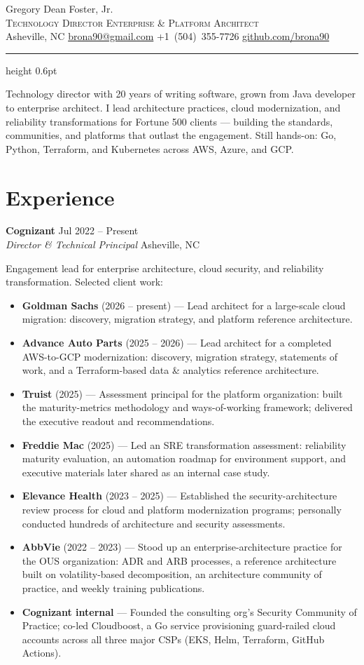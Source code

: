 \documentclass[letterpaper,10pt]{article}
\newcommand{\role}[4]{%
  \par\vspace{8pt}%
  \textbf{\large #1} \hfill {\small\color{muted}#4}\\
  \textit{#3} \hfill {\small\color{muted}#2}\par\vspace{1pt}}
\newenvironment{clients}
  {\begin{itemize}[leftmargin=13pt, itemsep=3pt, topsep=3pt,
                   label=\textcolor{gold}{\textbullet}]}
  {\end{itemize}}
\newcommand{\client}[2]{\item \textbf{#1} — #2}
\newcommand{\datedclient}[3]{\item \textbf{#1} {\small\color{muted}(#2)} — #3}
\newcommand{\sep}{\;\textperiodcentered\;}
\begin{document}
{\huge Gregory Dean Foster, Jr.}\\[5pt]
{\small\color{muted}\scshape Technology Director \sep{} Enterprise \& Platform Architect}\\[3pt]
{\small Asheville, NC
  \sep \href{mailto:brona90@gmail.com}{brona90@gmail.com}
  \sep +1~(504)~355-7726
  \sep \href{https://github.com/brona90}{github.com/brona90}}
\vspace{6pt}
{\color{gold}\hrule height 0.6pt}
\vspace{8pt}

Technology director with 20 years of writing software, grown from Java
developer to enterprise architect. I lead architecture practices, cloud
modernization, and reliability transformations for Fortune 500 clients ---
building the standards, communities, and platforms that outlast the
engagement. Still hands-on: Go, Python, Terraform, and Kubernetes across
AWS, Azure, and GCP.

\section{Experience}

\role{Cognizant}{Asheville, NC}{Director \& Technical Principal}{Jul 2022 -- Present}
Engagement lead for enterprise architecture, cloud security, and
reliability transformation. Selected client work:
\begin{clients}
  \datedclient{Goldman Sachs}{2026 -- present}{Lead architect for a
    large-scale cloud migration: discovery, migration strategy, and
    platform reference architecture.}
  \datedclient{Advance Auto Parts}{2025 -- 2026}{Lead architect for a
    completed AWS-to-GCP modernization: discovery, migration strategy,
    statements of work, and a Terraform-based data \& analytics
    reference architecture.}
  \datedclient{Truist}{2025}{Assessment principal for the platform
    organization: built the maturity-metrics methodology and
    ways-of-working framework; delivered the executive readout and
    recommendations.}
  \datedclient{Freddie Mac}{2025}{Led an SRE transformation assessment:
    reliability maturity evaluation, an automation roadmap for
    environment support, and executive materials later shared as an
    internal case study.}
  \datedclient{Elevance Health}{2023 -- 2025}{Established the
    security-architecture review process for cloud and platform
    modernization programs; personally conducted hundreds of
    architecture and security assessments.}
  \datedclient{AbbVie}{2022 -- 2023}{Stood up an enterprise-architecture
    practice for the OUS organization: ADR and ARB processes, a
    reference architecture built on volatility-based decomposition, an
    architecture community of practice, and weekly training
    publications.}
  \client{Cognizant internal}{Founded the consulting org's Security
    Community of Practice; co-led Cloudboost, a Go service provisioning
    guard-railed cloud accounts across all three major CSPs (EKS, Helm,
    Terraform, GitHub Actions).}
\end{clients}
\end{document}
